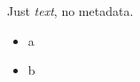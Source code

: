 \documentclass[
]{article}
\author{}
\date{}
\providecommand{\tightlist}{%
  \setlength{\itemsep}{0pt}\setlength{\parskip}{0pt}}
\begin{document}
Just \emph{text}, no metadata.

\begin{itemize}
\tightlist
\item
  a
\item
  b
\end{itemize}
\end{document}
